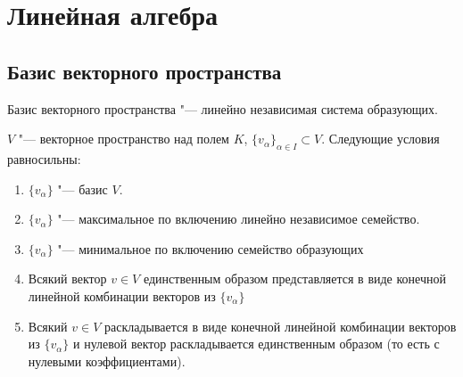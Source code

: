 ﻿

\chapter{Линейная алгебра}

\section{Базис векторного пространства}

\begin{Def}
	Базис векторного пространства "--- линейно независимая система образующих.
\end{Def}

\begin{theorem}
	$V$ "--- векторное пространство над полем $K$, $\{v_{\alpha}\}_{\alpha \in I} \subset V$.
	Следующие условия равносильны:
	\begin{enumerate}
	\item
		$\{v_{\alpha}\}$ "--- базис $V$.

	\item
		$\{v_{\alpha}\}$ "--- максимальное по включению линейно независимое семейство.

	\item
		$\{v_{\alpha}\}$ "--- минимальное по включению семейство образующих

	\item
		Всякий вектор $v \in V$ единственным образом представляется в виде конечной
		линейной комбинации векторов из $\{v_{\alpha}\}$

	\item
		Всякий $v \in V$ раскладывается в виде конечной линейной комбинации векторов из
		$\{v_{\alpha}\}$ и нулевой вектор раскладывается единственным образом (то есть с нулевыми коэффициентами).
	\end{enumerate}
\end{theorem}
